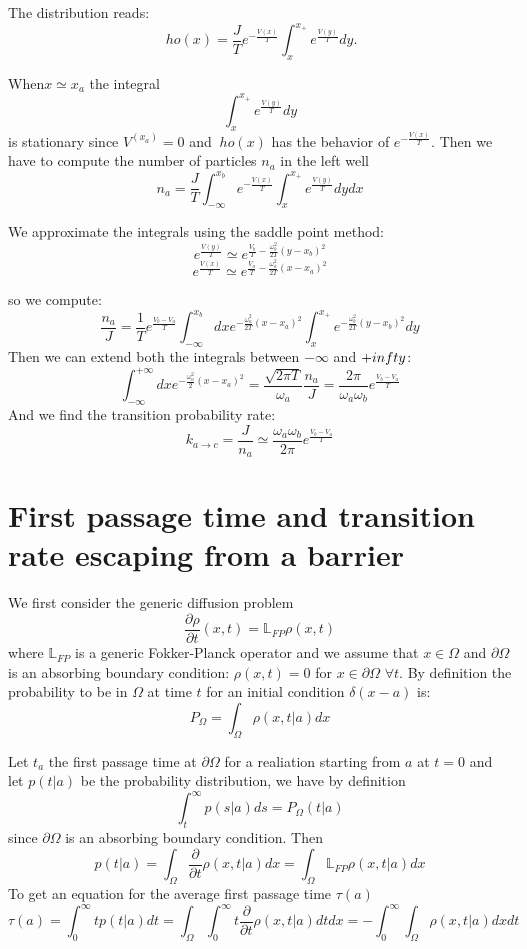The distribution reads:
$$
\
ho(x) = \frac{J}{T} e^{-\frac{V(x)}{T}}\int_x^{x_{+}}e^{\frac{V(y)}{T}}dy.
$$

When$x \simeq x_a$ the integral
$$
\int_x^{x_{+}}e^{\frac{V(y)}{T}}dy
$$
is stationary since $V^(x_a) = 0$ and $\
ho(x)$ has the behavior of $e^{-\frac{V(x)}{T}}$.
Then we have to compute the number of particles $n_a$ in the left well
$$
n_a = \frac{J}{T}\int_{-\infty}^{x_{b}} e^{-\frac{V(x)}{T}} \int_{x}^{x_+} e^{\frac{V(y)}{T}} dy dx
$$

We approximate the integrals using the saddle point method:
$$
e^{\frac{V(y)}{T}} \simeq e^{\frac{V_b}{T} - \frac{\omega^2_b}{2T}(y-x_b)^2}
$$
$$
e^{\frac{V(x)}{T}} \simeq e^{\frac{V_a}{T} - \frac{\omega^2_a}{2T}(x-x_a)^2}
$$

so we compute:
$$
\frac{n_a}{J} = \frac{1}{T} e^{\frac{V_b-V_a}{T}}\int_{-\infty}^{x_b}dxe^{-\frac{\omega_a^2}{2T}(x-x_a)^2}\int_x^{x_+}e^{-\frac{\omega_b^2}{2T}(y-x_b)^2 }dy
$$
Then we can extend both the integrals between $-\infty$ and $+\\infty$:
$$
\int_{-\infty}^{+\infty}dxe^{-\frac{\omega_a^2}{2}(x-x_a)^2} = \frac{\sqrt{2 \pi T}}{\omega_a}\frac{n_a}{J}=\frac{2\pi}{\omega_a\omega_b}e^{\frac{V_b-V_a}{T}}
$$
And we find the transition probability rate:
$$
k_{a\to c} = \frac{J}{n_a} \simeq \frac{\omega_a \omega_b}{2 \pi} e^{\frac{V_b-V_a}{T}}
$$

\section{First passage time and transition rate escaping from a barrier}
We first consider the generic diffusion problem 
$$
\frac{\partial \rho}{\partial t} (x,t) = \mathbb{L}_{FP} \rho(x,t)
$$
where $\mathbb{L}_{FP}$ is a generic Fokker-Planck operator and we assume that $x \in \Omega$ and $\partial \Omega$ is an absorbing boundary condition: $\rho(x,t) =0 $ for $x\in \partial \Omega$ $\forall t$. By definition the probability to be in $\Omega$ at time $t$ for an initial condition $\delta(x-a)$ is:
$$
P_{\Omega} = \int_{\Omega} \rho(x,t|a)dx 
$$

Let $t_a$ the first passage time at $\partial \Omega$ for a realiation starting from $a$ at $t=0$ and let $p(t|a)$ be the probability distribution, we have by definition 
$$
\int_t^{\infty} p(s|a)ds = P_\Omega(t|a)
$$
since $\partial \Omega$ is an absorbing boundary condition. Then
$$
p(t|a) = \int_{\Omega} \frac{\partial}{\partial t} \rho (x,t|a)dx = \int_{\Omega} \mathbb{L}_{FP} \rho(x,t|a)dx
$$
To get an equation for the average first passage time $\tau(a)$
$$
\tau(a) = \int_{0}^{\infty} t p(t|a) dt = \int_{\Omega}\int_{0}^{\infty} t \frac{\partial}{\partial t} \rho(x,t|a)dt dx = - \int_{0}^{\infty} \int_\Omega \rho(x,t|a)dx dt
$$

